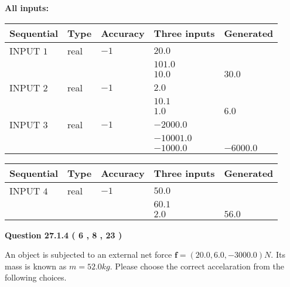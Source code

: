 \documentclass[12pt]{article}
\begin{document}
   
   
   
\noindent\vspace{0.1in}\hspace{-0.08in} {\textbf{\Large{All inputs: }}}
   
   
  
  
\noindent\begin{tabular}{|l|l|l|l|l|}
\hline
 Sequential & Type & Accuracy & Three inputs & Generated \\ 
\hline
 
 
  INPUT $            1 $ & real & $           -1  $ & $
 20.0
  $ & \\
  & & &  $
 101.0
  $ & \\
  & & &  $
 10.0
 $ & $ 30.0 $ 
 \\  \hline  
 
 
  INPUT $            2 $ & real & $           -1  $ & $
 2.0
  $ & \\
  & & &  $
 10.1
  $ & \\
  & & &  $
 1.0
 $ & $ 6.0 $ 
 \\  \hline  
 
 
  INPUT $            3 $ & real & $           -1  $ & $
 -2000.0
  $ & \\
  & & &  $
 -10001.0
  $ & \\
  & & &  $
 -1000.0
 $ & $ -6000.0 $ 
 \\  \hline  
 \end{tabular}
   
   
  
  
\noindent\begin{tabular}{|l|l|l|l|l|}
\hline
 Sequential & Type & Accuracy & Three inputs & Generated \\ 
\hline
 
 
  INPUT $            4 $ & real & $           -1  $ & $
 50.0
  $ & \\
  & & &  $
 60.1
  $ & \\
  & & &  $
 2.0
 $ & $ 56.0 $ 
 \\  \hline  
 \end{tabular}
   
   
  
\vspace{0.2in}
  
{\textbf{\Large{Question
27.1.4 
 (           6 ,           8 ,          23 )
}}}
  
  
 
An object is subjected to an external net force $\mathbf{f}=(
20.0 ,
6.0,
-3000.0  )N$. Its mass is known as
$m= %
52.0  kg$. Please choose the correct accelaration
from the following choices.
 
\end{document}
